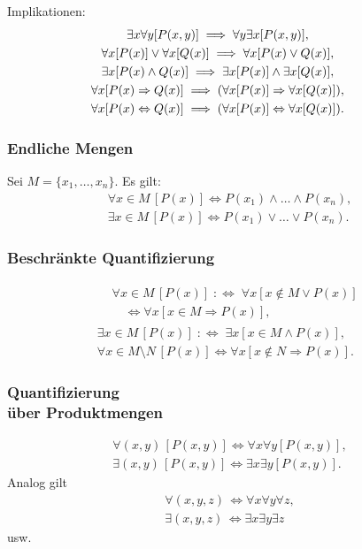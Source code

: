 Implikationen:
\begin{gather}
\hspace{-2em}\exists x\forall y[P(x,y)]\implies \forall y\exists x[P(x,y)],\\
\hspace{-2em}\forall x[P(x)]\lor\forall x[Q(x)]\implies\forall x[P(x)\lor Q(x)],\\
\hspace{-2em}\exists x[P(x)\land Q(x)]\implies
  \exists x[P(x)]\land \exists x[Q(x)],\\
\hspace{-2em}\forall x[P(x)\Rightarrow Q(x)]\implies
  (\forall x[P(x)]\Rightarrow\forall x[Q(x)]),\\
\hspace{-2em}\forall x[P(x)\Leftrightarrow Q(x)]\implies
  (\forall x[P(x)]\Leftrightarrow\forall x[Q(x)]).
\end{gather}

\subsubsection{Endliche Mengen}
Sei $M=\{x_1,\ldots,x_n\}$. Es gilt:
\begin{gather}
\forall x{\in}M\,[P(x)]\iff P(x_1)\land\ldots\land P(x_n),\\
\exists x{\in}M\,[P(x)]\iff P(x_1)\lor\ldots\lor P(x_n).
\end{gather}

\subsubsection{Beschränkte Quantifizierung}
\begin{gather}
\begin{split}
& \forall x{\in}M\,[P(x)]\;:\Longleftrightarrow\;\forall x[x\notin M\lor P(x)]\\
& \quad\iff\forall x[x\in M\Rightarrow P(x)],
\end{split}\\
\exists x{\in}M\,[P(x)]\;:\Longleftrightarrow\;\exists x[x\in M\land P(x)],\\
\forall x{\in}M{\setminus}N\,[P(x)]\iff \forall x[x\notin N\Rightarrow P(x)].
\end{gather}

\subsubsection{Quantifizierung\\
über Produktmengen}
\begin{gather}
\forall(x,y)\,[P(x,y)]\iff \forall x\forall y[P(x,y)],\\
\exists(x,y)\,[P(x,y)]\iff \exists x\exists y[P(x,y)].
\end{gather}
Analog gilt
\begin{gather}
\forall(x,y,z)\,\iff \forall x\forall y\forall z,\\
\exists(x,y,z)\,\iff \exists x\exists y\exists z
\end{gather}
usw.


